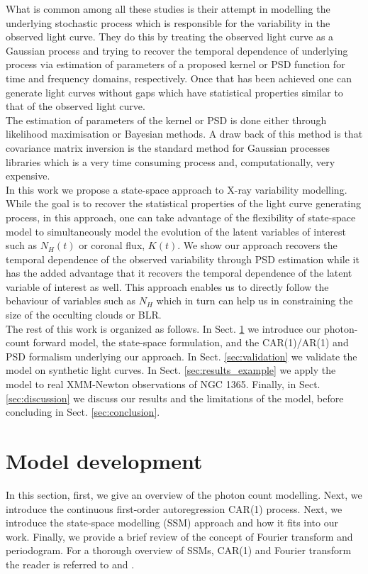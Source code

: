 \documentclass{aa}
\begin{document}
What is common among all these studies is their attempt in modelling the underlying stochastic process which is responsible for the variability in the observed light curve. They do this by treating the observed light curve as a Gaussian process and trying to recover the temporal dependence of underlying process via estimation of parameters of a proposed kernel or PSD function for time and frequency domains, respectively. Once that has been achieved one can generate light curves without gaps which have statistical properties similar to that of the observed light curve. \\
The estimation of parameters of the kernel or PSD is done either through likelihood maximisation or Bayesian methods. A draw back of this method is that covariance matrix inversion is the standard method for Gaussian processes libraries which is a very time consuming process and, computationally, very expensive. \\ 
In this work we propose a state-space approach to X-ray variability modelling. While the goal is to recover the statistical properties of the light curve generating process, in this approach, one can take advantage of the flexibility of state-space model to simultaneously model the evolution of the latent variables of interest such as $N_H(t)$ or coronal flux, $K(t)$. We show our approach recovers the temporal dependence of the observed variability through PSD estimation while it has the added advantage that it recovers the temporal dependence of the latent variable of interest as well. This approach enables us to directly follow the behaviour of variables such as $N_H$ which in turn can help us in constraining the size of the occulting clouds or BLR. \\
The rest of this work is organized as follows. In Sect. \ref{sec:model_dev} we introduce our photon-count forward model, the state-space formulation, and the CAR(1)/AR(1) and PSD formalism underlying our approach. In Sect. \ref{sec:validation} we validate the model on synthetic light curves. In Sect. \ref{sec:results_example} we apply the model to real XMM-Newton observations of NGC 1365. Finally, in Sect. \ref{sec:discussion} we discuss our results and the limitations of the model, before concluding in Sect. \ref{sec:conclusion}.


\section{Model development}
\label{sec:model_dev}
In this section, first, we give an overview of the photon count modelling. Next, we introduce the continuous first-order autoregression CAR(1) process. Next, we introduce the state-space modelling (SSM) approach and how it fits into our work. Finally, we provide a brief review of the concept of Fourier transform and periodogram. For a thorough overview of SSMs, CAR(1) and Fourier transform the reader is referred to \citet{Priestley1981} and \citet{BrockwellDavis2002}. \\
\end{document}
